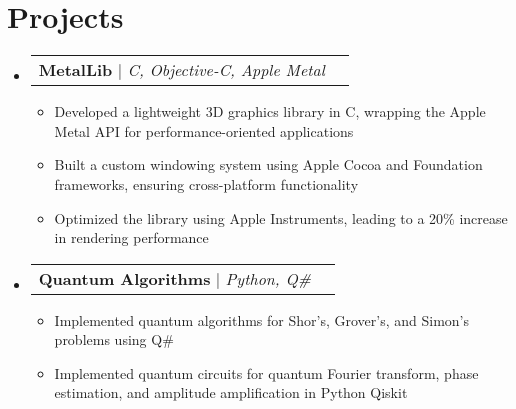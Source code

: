 \documentclass[letterpaper,11pt]{article}
\makeatletter
\newcommand{\resumeItem}[1]{\item\small{#1 \vspace{-2pt}}}
\newcommand{\resumeProjectHeading}[2]{
    \item
    \begin{tabular*}{0.97\textwidth}{l@{\extracolsep{\fill}}r}
      \small#1 & #2 \\
    \end{tabular*}\vspace{-7pt}
}
\newcommand{\resumeSubHeadingListStart}{\begin{itemize}[leftmargin=0.15in, label={}]}
\newcommand{\resumeSubHeadingListEnd}{\end{itemize}}
\newcommand{\resumeItemListStart}{\begin{itemize}}
\newcommand{\resumeItemListEnd}{\end{itemize}\vspace{-5pt}}
\makeatother
\begin{document}
\section{Projects}
    \resumeSubHeadingListStart
      \resumeProjectHeading
          {\textbf{MetalLib} $|$ \emph{C, Objective-C, Apple Metal}}{}
          \resumeItemListStart
            \resumeItem{Developed a lightweight 3D graphics library in C, wrapping the Apple Metal API for performance-oriented applications}
            \resumeItem{Built a custom windowing system using Apple Cocoa and Foundation frameworks, ensuring cross-platform functionality}
            \resumeItem{Optimized the library using Apple Instruments, leading to a 20\% increase in rendering performance}
          \resumeItemListEnd
          
      \resumeProjectHeading
          {\textbf{Quantum Algorithms} $|$ \emph{Python, Q\#}}{}
          \resumeItemListStart
            \resumeItem{Implemented quantum algorithms for Shor's, Grover's, and Simon's problems using Q\#}
            \resumeItem{Implemented quantum circuits for quantum Fourier transform, phase estimation, and amplitude amplification in Python Qiskit}
          \resumeItemListEnd
    \resumeSubHeadingListEnd
\end{document}
